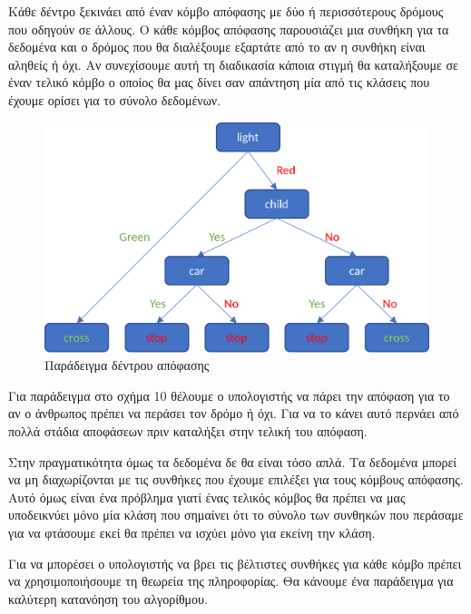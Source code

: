 Κάθε δέντρο ξεκινάει από έναν κόμβο απόφασης με δύο ή περισσότερους δρόμους που οδηγούν σε άλλους.
Ο κάθε κόμβος απόφασης παρουσιάζει μια συνθήκη για τα δεδομένα και ο δρόμος που θα διαλέξουμε
εξαρτάτε από το αν η συνθήκη είναι αληθείς ή όχι. Αν συνεχίσουμε αυτή τη διαδικασία κάποια στιγμή
θα καταλήξουμε σε έναν τελικό κόμβο ο οποίος θα μας δίνει σαν απάντηση μία από τις κλάσεις που
έχουμε ορίσει για το σύνολο δεδομένων.
\begin{figure}[H]
    \centering
    \includegraphics[width=1\textwidth]{images/decisionTree.png}
    \caption{Παράδειγμα δέντρου απόφασης}
\end{figure}
Για παράδειγμα στο σχήμα 10 θέλουμε ο υπολογιστής να πάρει την απόφαση για το αν ο άνθρωπος πρέπει
να περάσει τον δρόμο ή όχι. Για να το κάνει αυτό περνάει από πολλά στάδια αποφάσεων πριν καταλήξει
στην τελική του απόφαση.

Στην πραγματικότητα όμως τα δεδομένα δε θα είναι τόσο απλά. Τα δεδομένα μπορεί να μη διαχωρίζονται
με τις συνθήκες που έχουμε επιλέξει για τους κόμβους απόφασης. Αυτό όμως είναι ένα πρόβλημα γιατί
ένας τελικός κόμβος θα πρέπει να μας υποδεικνύει μόνο μία κλάση που σημαίνει ότι το σύνολο των
συνθηκών που περάσαμε για να φτάσουμε εκεί θα πρέπει να ισχύει μόνο για εκείνη την κλάση.

Για να μπορέσει ο υπολογιστής να βρει τις βέλτιστες συνθήκες για κάθε κόμβο πρέπει να
χρησιμοποιήσουμε τη θεωρεία της πληροφορίας. Θα κάνουμε ένα παράδειγμα για καλύτερη κατανόηση
του αλγορίθμου.

